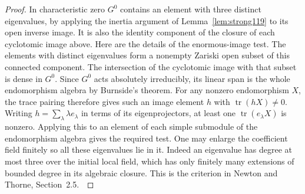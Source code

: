 \documentclass[a4paper,11pt]{article}
\theoremstyle{definition}
\theoremstyle{remark}
\numberwithin{equation}{section}
\begin{document}
\begin{proof}
In characteristic zero \(G^0\) contains an element with three
distinct eigenvalues, by applying the inertia argument of
Lemma~\ref{lem:strong119} to its open inverse image. It is
also the identity component of the closure of each cyclotomic
image above. Here are the details of the enormous-image test.
The elements with distinct eigenvalues form a nonempty Zariski
open subset of this connected component. The intersection of
the cyclotomic image with that subset is dense in \(G^0\).
Since \(G^0\) acts absolutely irreducibly, its linear span is
the whole endomorphism algebra by Burnside's theorem. For
any nonzero endomorphism \(X\), the trace pairing therefore
gives such an image element \(h\) with \(\operatorname{tr}(hX)\ne0\).
Writing \(h=\sum_\lambda\lambda e_\lambda\) in terms of its
eigenprojectors, at least one \(\operatorname{tr}(e_\lambda X)\)
is nonzero. Applying this to an element of each simple submodule
of the endomorphism algebra gives the required test. One may
enlarge the coefficient field finitely so all these eigenvalues
lie in it. Indeed an eigenvalue has degree at most three over
the initial local field, which has only finitely many extensions
of bounded degree in its algebraic closure. This is the
criterion in Newton and Thorne, Section~2.5.~\cite{VI-IV-VI-nt119}
\end{proof}
\end{document}
